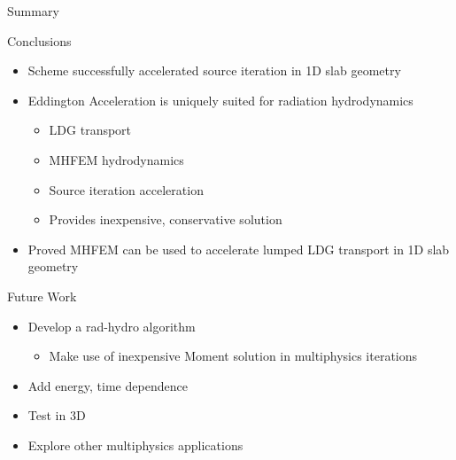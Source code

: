 \documentclass[10pt]{beamer}
\begin{document}
\begin{frame}{Summary}

    \onslide<+->
    Conclusions
    \begin{itemize} \vspace{-.1in}
        \item Scheme successfully accelerated source iteration in 1D slab geometry 



        \item Eddington Acceleration is uniquely suited for radiation hydrodynamics 
        \begin{itemize}
        	\item LDG transport 
        	\item MHFEM hydrodynamics 
        	\item Source iteration acceleration 
        	\item Provides inexpensive, conservative solution 
        \end{itemize}

        \item Proved MHFEM can be used to accelerate lumped LDG transport in 1D slab geometry 

    \end{itemize}

    \onslide<+->
    Future Work 
    \begin{itemize} \vspace{-.1in}
        \item Develop a rad-hydro algorithm 

        \begin{itemize}
            \item Make use of inexpensive Moment solution in multiphysics iterations 
        \end{itemize}

        \item Add energy, time dependence 

        \item Test in 3D 


        \item Explore other multiphysics applications 

    \end{itemize}

\end{frame}
\end{document}
